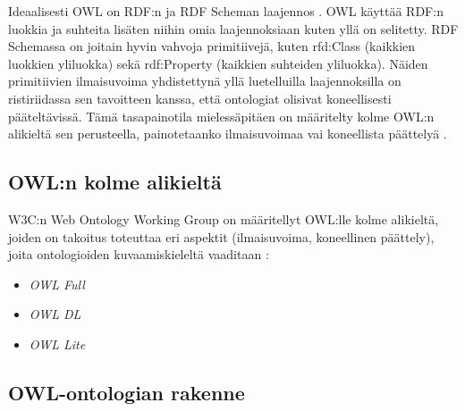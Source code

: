 \documentclass[finnish]{tktltiki2}
\theoremstyle{definition}
\theoremstyle{remark}
\begin{document}
Ideaalisesti OWL on RDF:n ja RDF Scheman laajennos \cite{AH09}. OWL käyttää
RDF:n luokkia ja suhteita lisäten niihin omia laajennoksiaan kuten yllä on
selitetty. RDF Schemassa on joitain hyvin vahvoja primitiivejä, kuten rfd:Class
(kaikkien luokkien yliluokka) sekä rdf:Property (kaikkien suhteiden yliluokka).
Näiden primitiivien ilmaisuvoima yhdistettynä yllä luetelluilla laajennoksilla
on ristiriidassa sen tavoitteen kanssa, että ontologiat olisivat koneellisesti
pääteltävissä. Tämä tasapainotila mielessäpitäen on määritelty kolme OWL:n
alikieltä sen perusteella, painotetaanko ilmaisuvoimaa vai koneellista päättelyä
\cite{AH09}.  

\subsection{OWL:n kolme alikieltä}

W3C:n Web Ontology Working Group on määritellyt OWL:lle kolme alikieltä, joiden
on takoitus toteuttaa eri aspektit (ilmaisuvoima, koneellinen päättely), joita
ontologioiden kuvaamiskieleltä vaaditaan \cite{MH04}:

\begin{itemize}
 \item \textit{OWL Full}
 \item \textit{OWL DL}
 \item \textit{OWL Lite}
\end{itemize}

\subsection{OWL-ontologian rakenne}
\end{document}
